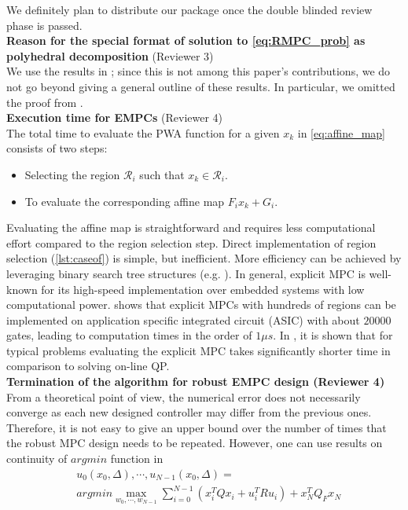 {We definitely plan to distribute our package once the double blinded review phase is passed.\\ 
\textbf{Reason for the special format of solution to \autoref{eq:RMPC_prob} as polyhedral decomposition} (Reviewer 3)\\
We use the results in \cite{delaPea:2005}; since this is not among this paper's contributions, we do not go beyond giving a general outline of these results. In particular, we omitted the proof from \cite{delaPea:2005}.
\\
\textbf{Execution time for EMPCs} (Reviewer 4)\\
The total time to evaluate the PWA function for a given $x_k$ in \autoref{eq:affine_map} consists of two steps:
\begin{itemize}
\item Selecting the region $\mathcal R_i$ such that $x_k\in \mathcal R_i$.
\item To evaluate the corresponding affine map $F_i x_k +G_i$. 
\end{itemize}
Evaluating the affine map is straightforward and requires less computational effort compared to the region selection step. Direct implementation of region selection (\autoref{lst:caseof}) is simple, but inefficient. More efficiency can be achieved by leveraging binary search tree structures (e.g. \cite{Mnnigmann:2011}). In general, explicit MPC is well-known for its high-speed implementation over embedded systems with low computational power. \cite{Johansen:2007} shows that explicit MPCs with hundreds of regions can be implemented on application specific integrated circuit (ASIC) with about $20000$ gates, leading to computation times in the order of $1\mu s$. In \cite{Bemporad:2006}, it is shown that for typical problems evaluating the explicit MPC takes significantly shorter time in comparison to solving on-line QP. \\
\textbf{Termination of the algorithm for robust EMPC design (Reviewer 4)}\\
From a theoretical point of view, the numerical error does not necessarily converge as each new designed controller may differ from the previous ones. Therefore, it is not easy to give an upper bound over the number of times that the robust MPC design needs to be repeated. However, one can use results on continuity of $argmin$ function in 
\begin{align*}
\label{eq:argmin}
&u_0(x_0,\Delta),\cdots,u_{N-1}(x_0,\Delta)=\\
&argmin \max_{w_0,\cdots,w_{N-1}} \sum_{i=0}^{N-1}(x_i^TQx_i+u_i^TRu_i) + x_N^TQ_Fx_N\nonumber\\

\end{align*}}
